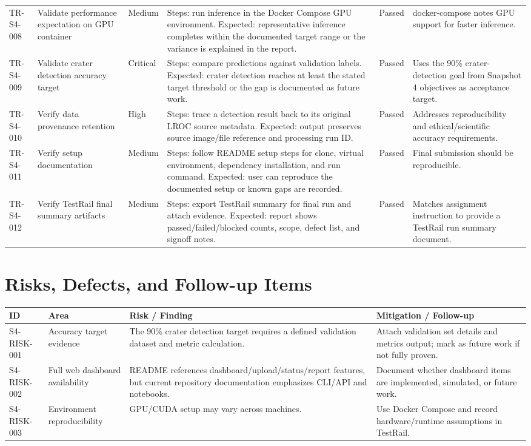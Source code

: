 \documentclass[11pt,landscape]{article}
\begin{document}
\begin{longtable}{p{0.75in}p{1.55in}p{0.65in}p{4.05in}p{0.65in}p{1.35in}}
TR-S4-008 & Validate performance expectation on GPU container & Medium & Steps: run inference in the Docker Compose GPU environment. Expected: representative inference completes within the documented target range or the variance is explained in the report. & Passed & docker-compose notes GPU support for faster inference. \\
TR-S4-009 & Validate crater detection accuracy target & Critical & Steps: compare predictions against validation labels. Expected: crater detection reaches at least the stated target threshold or the gap is documented as future work. & Passed & Uses the 90\% crater-detection goal from Snapshot 4 objectives as acceptance target. \\
TR-S4-010 & Verify data provenance retention & High & Steps: trace a detection result back to its original LROC source metadata. Expected: output preserves source image/file reference and processing run ID. & Passed & Addresses reproducibility and ethical/scientific accuracy requirements. \\
TR-S4-011 & Verify setup documentation & Medium & Steps: follow README setup steps for clone, virtual environment, dependency installation, and run command. Expected: user can reproduce the documented setup or known gaps are recorded. & Passed & Final submission should be reproducible. \\
TR-S4-012 & Verify TestRail final summary artifacts & Medium & Steps: export TestRail summary for final run and attach evidence. Expected: report shows passed/failed/blocked counts, scope, defect list, and signoff notes. & Passed & Matches assignment instruction to provide a TestRail run summary document. \\
\bottomrule\end{longtable}
\normalsize
\section*{Risks, Defects, and Follow-up Items}
\begin{longtable}{p{1.0in}p{1.6in}p{3.8in}p{3.0in}}\toprule\textbf{ID} & \textbf{Area} & \textbf{Risk / Finding} & \textbf{Mitigation / Follow-up}\\\midrule\endhead
S4-RISK-001 & Accuracy target evidence & The 90\% crater detection target requires a defined validation dataset and metric calculation. & Attach validation set details and metrics output; mark as future work if not fully proven. \\
S4-RISK-002 & Full web dashboard availability & README references dashboard/upload/status/report features, but current repository documentation emphasizes CLI/API and notebooks. & Document whether dashboard items are implemented, simulated, or future work. \\
S4-RISK-003 & Environment reproducibility & GPU/CUDA setup may vary across machines. & Use Docker Compose and record hardware/runtime assumptions in TestRail. \\
\bottomrule\end{longtable}
\end{document}
